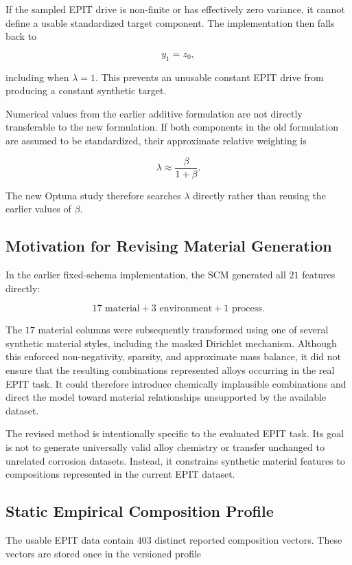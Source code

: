 \documentclass{article}
\begin{document}
If the sampled EPIT drive is non-finite or has effectively zero variance, it
cannot define a usable standardized target component. The implementation then
falls back to

\[
y_1=z_0,
\]

including when \(\lambda=1\). This prevents an unusable constant EPIT drive from
producing a constant synthetic target.

Numerical values from the earlier additive formulation are not directly
transferable to the new formulation. If both components in the old formulation
are assumed to be standardized, their approximate relative weighting is

\[
\lambda
\approx
\frac{\beta}{1+\beta}.
\]

The new Optuna study therefore searches \(\lambda\) directly rather than reusing
the earlier values of \(\beta\).

\subsection{Motivation for Revising Material Generation}

In the earlier fixed-schema implementation, the SCM generated all \(21\)
features directly:

\[
17 \text{ material}
+
3 \text{ environment}
+
1 \text{ process}.
\]

The \(17\) material columns were subsequently transformed using one of several
synthetic material styles, including the masked Dirichlet mechanism. Although
this enforced non-negativity, sparsity, and approximate mass balance, it did not
ensure that the resulting combinations represented alloys occurring in the real
EPIT task. It could therefore introduce chemically implausible combinations and
direct the model toward material relationships unsupported by the available
dataset.

The revised method is intentionally specific to the evaluated EPIT task. Its
goal is not to generate universally valid alloy chemistry or transfer unchanged
to unrelated corrosion datasets. Instead, it constrains synthetic material
features to compositions represented in the current EPIT dataset.

\subsection{Static Empirical Composition Profile}

The usable EPIT data contain \(403\) distinct reported composition vectors. These
vectors are stored once in the versioned profile
\end{document}
